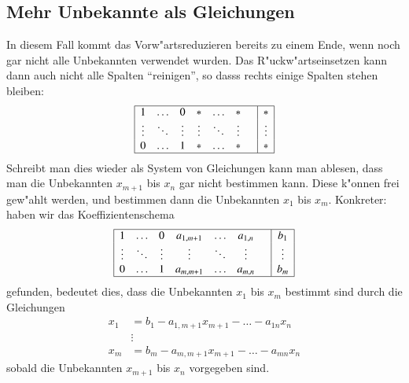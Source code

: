 \subsection{Mehr Unbekannte als Gleichungen}
In diesem Fall kommt das Vorw"artsreduzieren bereits zu einem Ende,
wenn noch gar nicht alle Unbekannten verwendet wurden.
Das R"uckw"artseinsetzen kann dann auch nicht alle Spalten ``reinigen'',
so dasss rechts einige Spalten stehen bleiben:
\begin{gather}
\begin{array}{|ccccccc|c|}
\hline
1&\dots&0&*&\dots&*&&*\\
\vdots&\ddots&\vdots&\vdots&\ddots&\vdots&&\vdots\\
0&\dots&1&*&\dots&*&&*\\
\hline
\end{array}
\end{gather}
Schreibt man dies wieder als System von Gleichungen kann man ablesen,
dass man die Unbekannten $x_{m+1}$ bis $x_n$ gar nicht bestimmen kann.
Diese k"onnen frei gew"ahlt werden, und bestimmen dann die Unbekannten
$x_1$ bis $x_m$.
Konkreter: haben wir das Koeffizientenschema
\begin{gather}
\begin{array}{|ccccccc|c|}
\hline
1&\dots&0&a_{1,m+1}&\dots&a_{1,n}&&b_1\\
\vdots&\ddots&\vdots&\vdots&\ddots&\vdots&&\vdots\\
0&\dots&1&a_{m,m+1}&\dots&a_{m,n}&&b_m\\
\hline
\end{array}
\end{gather}
gefunden, bedeutet dies, dass die Unbekannten $x_1$ bis $x_m$ bestimmt
sind durch die Gleichungen
\begin{align*}
x_1&=b_1-a_{1,m+1}x_{m+1}-\dots-a_{1n}x_n\\
&\vdots\\
x_m&=b_m-a_{m,m+1}x_{m+1}-\dots-a_{mn}x_n
\end{align*}
sobald die Unbekannten $x_{m+1}$ bis $x_n$ vorgegeben sind.
